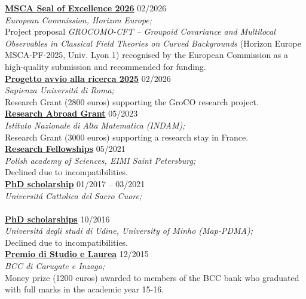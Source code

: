 \documentclass[a4paper]{article}
\newcommand{\voice}[5]{\href{#4}{\textbf{#1}} \hfill #2 \\ \textit{#3} \\ {\small #5} \vspace{0.2cm} \\}
\begin{document}
    
    \voice{MSCA Seal of Excellence 2026}
        {02/2026}
        {European Commission, Horizon Europe;}
        {https://www.dropbox.com/scl/fi/zr05hlqz8rpq4d9j51b7q/2602-MSCA-SealofExcellence.pdf?rlkey=ovu5ad8hmdjh9nkaqy8rmq3lb&st=wbag5jwb&dl=0}       
        {Project proposal \emph{GROCOMO-CFT – Groupoid Covariance and Multilocal Observables in Classical Field Theories on Curved Backgrounds} (Horizon Europe MSCA-PF-2025, Univ. Lyon 1) recognised by the European Commission as a high-quality submission and recommended for funding.}
    \voice{Progetto avvio alla ricerca 2025}
        {02/2026}
        {Sapienza Universit\'a di Roma;}
        {https://research.uniroma1.it/cerca/irisap/SAP_RICERCA_2025_GROCO_MITI_A_01?anno=&tipo=&area=&title=groupoid&structure=&form_build_id=form-DBnmXGkJc8k86RbACkhHb-lwkkcooJaQmzI4238724Q&form_token=wq-Z-8duVSxCLFAB2wdHYw-dmNiRB4ijekxP1jC28B8&form_id=irisap_search_form&op=Cerca}       
        {Research Grant (2800 euros) supporting the GroCO research project.}
    \voice{Research Abroad Grant}
        {05/2023}
        {Istituto Nazionale di Alta Matematica (INDAM);}
        {https://www.altamatematica.it/wp-content/uploads/2022/12/bando-estero-2022-2023-1.pdf}       
        {Research Grant (3000 euros) supporting a research stay in France.}
    \voice{Research Fellowships}
        {05/2021}
        {Polish academy of Sciences, EIMI Saint Petersburg;}
        {}       
        {Declined due to incompatibilities.}
    \voice{PhD scholarship}
        {01/2017 -- 03/2021}
        {Universit\'a Cattolica del Sacro Cuore;}
        {https://www.dropbox.com/s/pmsg20xsxd6x5yf/External_Scholarship.pdf?dl=0}       
        {\vspace{-0.5cm}}
    \voice{PhD scholarships}
        {10/2016}
        {Universit\'a degli studi di Udine, University of Minho (Map-PDMA);}
        {}       
        {Declined due to incompatibilities.}
    \voice{Premio di Studio e Laurea}
        {12/2015}
        {BCC di Carugate e Inzago;}
        {https://web.archive.org/web/20191207203437/https://www.bccmilano.it/news/dettaglio_news_div.asp?i_menuID=54872&hNewsID=132411}       
        {Money prize (1200 euros) awarded to members of the BCC bank who graduated with full marks in the academic year 15-16.}



\end{document}
